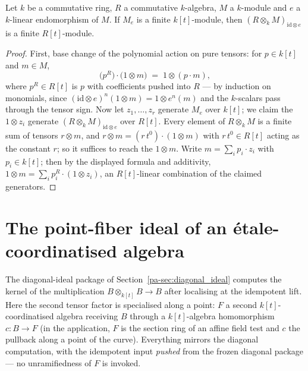 \begin{theorem}
  \label{pa-thm:moduleFinite_aeval_baseChange}
  \leanok

  Let \(k\) be a commutative ring, \(R\) a commutative \(k\)-algebra, \(M\) a
  \(k\)-module and \(e\) a \(k\)-linear endomorphism of \(M\). If \(M_e\) is a finite
  \(k[t]\)-module, then \((R \otimes_k M)_{\mathrm{id} \otimes e}\) is a finite
  \(R[t]\)-module.
\end{theorem}
\begin{proof}
  \leanok
  First, base change of the polynomial action on pure tensors: for \(p \in k[t]\) and
  \(m \in M\),
  \[
    \bigl(p^R\bigr) \cdot \bigl(1 \otimes m\bigr) \;=\; 1 \otimes (p \cdot m),
  \]
  where \(p^R \in R[t]\) is \(p\) with coefficients pushed into \(R\) --- by induction on
  monomials, since \((\mathrm{id} \otimes e)^n (1 \otimes m) = 1 \otimes e^n(m)\) and
  the \(k\)-scalars pass through the tensor sign. Now let \(z_1, \dots, z_r\) generate
  \(M_e\) over \(k[t]\); we claim the \(1 \otimes z_i\) generate
  \((R \otimes_k M)_{\mathrm{id}\otimes e}\) over \(R[t]\). Every element of
  \(R \otimes_k M\) is a finite sum of tensors \(r \otimes m\), and
  \(r \otimes m = (r\,t^0) \cdot (1 \otimes m)\) with \(r\,t^0 \in R[t]\) acting as the
  constant \(r\); so it suffices to reach the \(1 \otimes m\). Write
  \(m = \sum_i p_i \cdot z_i\) with \(p_i \in k[t]\); then by the displayed formula and
  additivity, \(1 \otimes m = \sum_i p_i^R \cdot (1 \otimes z_i)\), an \(R[t]\)-linear
  combination of the claimed generators.
\end{proof}

\section{The point-fiber ideal of an \'etale-coordinatised algebra}
\label{pa-sec:point_fiber_ideal}

The diagonal-ideal package of Section~\ref{pa-sec:diagonal_ideal} computes the kernel of the
multiplication \(B \otimes_{k[t]} B \to B\) after localising at the idempotent lift. Here
the second tensor factor is specialised along a point: \(F\) a second
\(k[t]\)-coordinatised algebra receiving \(B\) through a \(k[t]\)-algebra homomorphism
\(c \colon B \to F\) (in the application, \(F\) is the section ring of an affine field test
and \(c\) the pullback along a point of the curve). Everything mirrors the diagonal
computation, with the idempotent input \emph{pushed} from the frozen diagonal package — no
unramifiedness of \(F\) is invoked.

